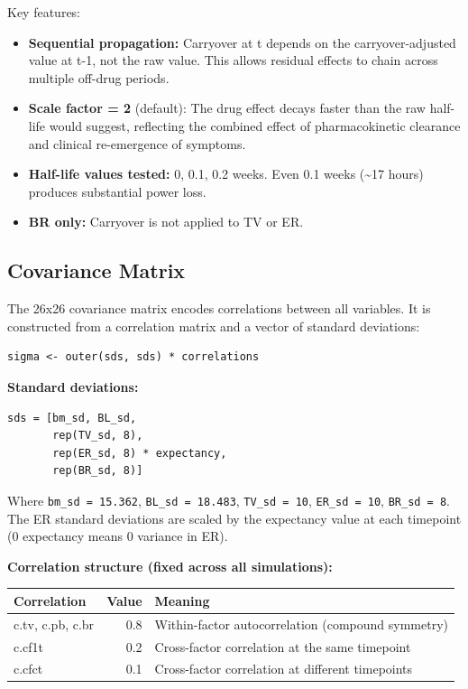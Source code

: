 \documentclass[11pt]{article}
\begin{document}
Key features:

\begin{itemize}
  \item \textbf{Sequential propagation:} Carryover at t depends on the
    carryover-adjusted value at t-1, not the raw value. This
    allows residual effects to chain across multiple off-drug
    periods.
  \item \textbf{Scale factor = 2} (default): The drug effect decays faster
    than the raw half-life would suggest, reflecting the combined
    effect of pharmacokinetic clearance and clinical re-emergence
    of symptoms.
  \item \textbf{Half-life values tested:} 0, 0.1, 0.2 weeks. Even 0.1 weeks
    (\textasciitilde 17 hours) produces substantial power loss.
  \item \textbf{BR only:} Carryover is not applied to TV or ER.
\end{itemize}

\subsection{Covariance Matrix}

The 26x26 covariance matrix encodes correlations between all
variables. It is constructed from a correlation matrix and a
vector of standard deviations:

\begin{lstlisting}
sigma <- outer(sds, sds) * correlations
\end{lstlisting}

\textbf{Standard deviations:}

\begin{verbatim}
sds = [bm_sd, BL_sd,
       rep(TV_sd, 8),
       rep(ER_sd, 8) * expectancy,
       rep(BR_sd, 8)]
\end{verbatim}

Where \texttt{bm\_sd = 15.362}, \texttt{BL\_sd = 18.483}, \texttt{TV\_sd = 10},
\texttt{ER\_sd = 10}, \texttt{BR\_sd = 8}. The ER standard deviations are
scaled by the expectancy value at each timepoint (0 expectancy
means 0 variance in ER).

\textbf{Correlation structure (fixed across all simulations):}

\begin{table}[h]
\centering
\begin{tabular}{lrl}
\toprule
Correlation & Value & Meaning \\
\midrule
c.tv, c.pb, c.br & 0.8 & Within-factor autocorrelation (compound symmetry) \\
c.cf1t & 0.2 & Cross-factor correlation at the same timepoint \\
c.cfct & 0.1 & Cross-factor correlation at different timepoints \\
\bottomrule
\end{tabular}
\end{table}
\end{document}
